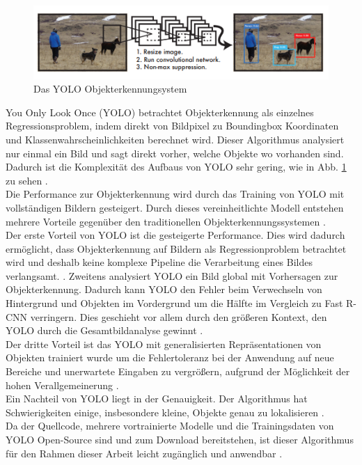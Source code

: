 {{	\begin{figure}[ht]
		\centering
		\includegraphics*[scale = 1, keepaspectratio, trim=2 2 2 2 ]{images/YOLO/YOLO_detection_system.png}
		\caption[Das YOLO Objekterkennungsystem]{Das YOLO Objekterkennungsystem \citep{Redmon2016}}
		\label{YOLO_Objectdetection}
 	\end{figure}\glqq You Only Look Once\grqq{} (YOLO) betrachtet Objekterkennung als einzelnes Regressionsproblem, indem direkt von Bildpixel zu Boundingbox Koordinaten und Klassenwahrscheinlichkeiten berechnet wird. Dieser Algorithmus analysiert nur einmal ein Bild und sagt direkt vorher, welche Objekte wo vorhanden sind. Dadurch ist die Komplexität des  Aufbaus von YOLO sehr gering, wie in Abb. \ref{YOLO_Objectdetection} zu sehen \citep{Redmon2016}. \\
	Die Performance zur Objekterkennung wird durch das Training von YOLO mit vollständigen Bildern gesteigert. Durch dieses vereinheitlichte Modell entstehen mehrere Vorteile gegenüber den traditionellen Objekterkennungssystemen \citep{Redmon2016}. \\
	Der erste Vorteil von YOLO ist die gesteigerte Performance. Dies wird dadurch ermöglicht, dass Objekterkennung auf Bildern als Regressionproblem betrachtet wird und deshalb keine komplexe Pipeline die Verarbeitung eines Bildes verlangsamt.  \citep{Redmon2016}. 
	Zweitens analysiert YOLO ein Bild global mit Vorhersagen zur Objekterkennung. Dadurch kann YOLO den Fehler beim Verwechseln von Hintergrund und Objekten im Vordergrund um die Hälfte im Vergleich zu Fast R-CNN verringern. Dies geschieht vor allem durch den größeren Kontext, den YOLO durch die Gesamtbildanalyse gewinnt \citep{Redmon2016}. \\
	Der dritte Vorteil ist das YOLO mit generalisierten Repräsentationen von Objekten trainiert wurde um die Fehlertoleranz bei der Anwendung auf neue Bereiche und unerwartete Eingaben zu vergrößern, aufgrund der Möglichkeit der hohen Verallgemeinerung \citep{Redmon2016}. \\
	Ein Nachteil von YOLO liegt in der Genauigkeit. Der Algorithmus hat Schwierigkeiten einige, insbesondere kleine, Objekte genau zu lokalisieren \citep{Redmon2016}. \\
	Da der Quellcode, mehrere vortrainierte Modelle und die Trainingsdaten von YOLO Open-Source sind und zum Download bereitstehen, ist dieser Algorithmus für den Rahmen dieser Arbeit leicht zugänglich und anwendbar \citep{Redmon2016}. \\

}}
